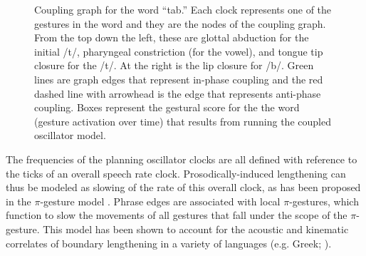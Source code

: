\documentclass[output=paper,
modfonts
]{LSP/langsci}
\begin{document}
\begin{figure}[htpb]
\label{fig:clockworks}
\caption{Coupling graph for the word ``tab.'' Each clock represents one of the gestures in the word and they are the nodes of the coupling graph.  From the top down the left, these are glottal abduction for the initial /t/,  pharyngeal constriction (for the vowel), and tongue tip closure for the /t/. At the right is the lip closure for /b/.   Green lines are graph edges that represent in-phase coupling and the red dashed line with arrowhead is the edge that represents anti-phase coupling. Boxes represent the gestural score for the the word (gesture activation over time) that results from running the coupled oscillator model.}
\end{figure}

The frequencies of the planning oscillator clocks are all defined with reference to the ticks of  an overall speech rate clock. Prosodically-induced lengthening can thus be modeled as slowing of the rate of this overall clock, as has been proposed in the $\pi$-gesture model \citep{Byrd2003}. Phrase edges are associated with local $\pi$-gestures, which function to slow the movements of all gestures that fall under the scope of the $\pi$-gesture. This model has been shown to account for the acoustic and kinematic correlates of boundary lengthening in a variety of languages (e.g. Greek; \citealt{Katsika2014}).
\end{document}
